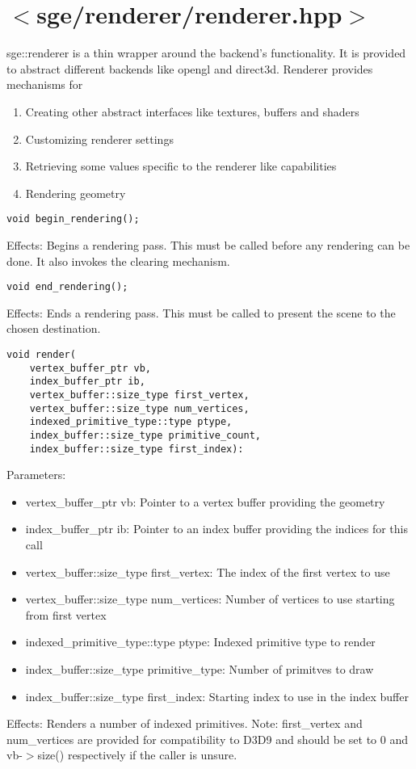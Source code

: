 \documentclass{article}
\begin{document}
\lstset{language=C++}

\section{$<$sge/renderer/renderer.hpp$>$}

sge::renderer is a thin wrapper around the backend's functionality.
It is provided to abstract different backends like opengl and direct3d.
Renderer provides mechanisms for
\begin{enumerate}
\item{Creating other abstract interfaces like textures, buffers and shaders}
\item{Customizing renderer settings}
\item{Retrieving some values specific to the renderer like capabilities}
\item{Rendering geometry}
\end{enumerate}

\begin{lstlisting}
void begin_rendering();
\end{lstlisting}
Effects: Begins a rendering pass.
This must be called before any rendering can be done.
It also invokes the clearing mechanism.

\begin{lstlisting}
void end_rendering();
\end{lstlisting}
Effects: Ends a rendering pass.
This must be called to present the scene to the chosen destination.

\begin{lstlisting}
void render(
	vertex_buffer_ptr vb,
 	index_buffer_ptr ib,
 	vertex_buffer::size_type first_vertex,
 	vertex_buffer::size_type num_vertices,
 	indexed_primitive_type::type ptype,
 	index_buffer::size_type primitive_count,
 	index_buffer::size_type first_index):
\end{lstlisting}
Parameters:
\begin{itemize}
\item vertex\_buffer\_ptr vb: Pointer to a vertex buffer providing the geometry
\item index\_buffer\_ptr ib: Pointer to an index buffer providing the indices for this call
\item vertex\_buffer::size\_type first\_vertex: The index of the first vertex to use
\item vertex\_buffer::size\_type num\_vertices: Number of vertices to use starting from first vertex
\item indexed\_primitive\_type::type ptype: Indexed primitive type to render
\item index\_buffer::size\_type primitive\_type: Number of primitves to draw
\item index\_buffer::size\_type first\_index: Starting index to use in the index buffer
\end{itemize}
Effects: Renders a number of indexed primitives.
Note: first\_vertex and num\_vertices are provided for compatibility to D3D9 and should be set to 0 and vb-$>$size() respectively if the caller is unsure.
\end{document}
